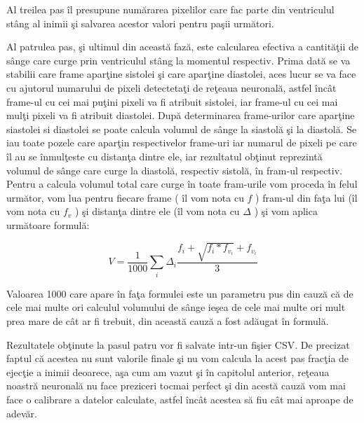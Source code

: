\par

Al treilea pas \^{i}l presupune num\u{a}rarea pixelilor care fac parte din ventriculul st\^{a}ng al inimii \c{s}i salvarea acestor valori pentru pa\c{s}ii urm\u{a}tori.

\par 

Al patrulea pas, \c{s}i ultimul din aceast\u{a} faz\u{a}, este calcularea efectiva a cantit\u{a}\c{t}ii de s\^{a}nge care curge prin ventriculul st\^{a}ng la momentul respectiv. Prima dat\u{a} se va stabilii care frame apar\c{t}ine sistolei \c{s}i care apar\c{t}ine diastolei, aces lucur se va face cu ajutorul numarului de pixeli detecteta\c{t}i de re\c{t}eaua neuronal\u{a}, astfel \^{i}nc\^{a}t frame-ul cu cei mai pu\c{t}ini pixeli va fi atribuit  sistolei, iar frame-ul cu cei mai mul\c{t}i pixeli va fi atribuit diastolei. Dup\u{a} determinarea frame-urilor care apar\c{t}ine siastolei si diastolei se poate calcula volumul de s\^{a}nge la siastol\u{a} \c{s}i la diastol\u{a}. Se iau toate pozele care apar\c{t}in respectivelor frame-uri iar numarul de pixeli pe care \^{i}l au se \^{i}nmul\c{t}este cu distan\c{t}a dintre ele, iar rezultatul ob\c{t}inut reprezint\u{a} volumul de s\^{a}nge care curge la diastol\u{a}, respectiv sistol\u{a}, \^{i}n fram-ul respectiv. Pentru a calcula volumul total care curge \^{i}n toate fram-urile vom proceda \^{i}n felul urm\u{a}tor, vom lua pentru fiecare frame ( \^{i}l vom nota cu $f$ ) fram-ul din fa\c{t}a lui (\^{i}l vom nota cu $f_v$ ) \c{s}i distan\c{t}a dintre ele (\^{i}l vom nota cu $\Delta$ ) \c{s}i vom aplica urm\u{a}toare formul\u{a}:

$$ V = \frac{1}{1000} \sum_i \Delta_i \frac{f_i + \sqrt{f_i * f_{v_i}} + f_{v_i}}{3} $$

Valoarea 1000 care apare \^{i}n fa\c{t}a formulei este un parametru pus din cauz\u{a} c\u{a} de cele mai multe ori calculul volumului de s\^{a}nge ie\c{s}ea de cele mai multe ori mult prea mare de c\^{a}t ar fi trebuit, din aceast\u{a} cauz\u{a} a fost ad\u{a}ugat \^{i}n formul\u{a}.

\par

Rezultatele ob\c{t}inute la pasul patru vor fi salvate intr-un fi\c{s}ier CSV. De precizat faptul c\u{a} acestea nu sunt valorile finale \c{s}i nu vom calcula la acest pas frac\c{t}ia de ejec\c{t}ie a inimii deoarece, a\c{s}a cum am vazut \c{s}i \^{i}n capitolul anterior, re\c{t}eaua noastr\u{a} neuronal\u{a} nu face preziceri tocmai perfect \c{s}i din acest\u{a} cauz\u{a} vom mai face o calibrare a datelor calculate, astfel \^{i}nc\^{a}t acestea s\u{a} fiu c\^{a}t mai aproape de adev\u{a}r.

